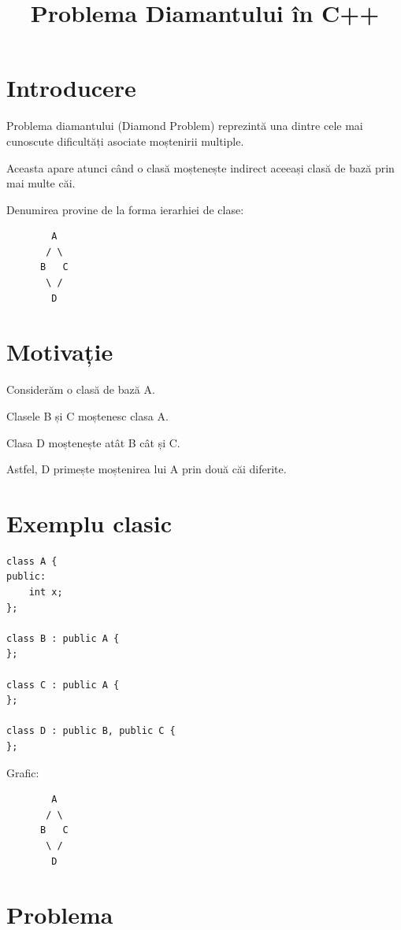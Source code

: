 \documentclass[12pt,a4paper]{article}
\title{Problema Diamantului în C++}
\author{}
\date{}
\begin{document}
\maketitle

\section{Introducere}

Problema diamantului (Diamond Problem) reprezintă una dintre cele mai cunoscute dificultăți asociate moștenirii multiple.

Aceasta apare atunci când o clasă moștenește indirect aceeași clasă de bază prin mai multe căi.

Denumirea provine de la forma ierarhiei de clase:

\begin{verbatim}
        A
       / \
      B   C
       \ /
        D
\end{verbatim}

\section{Motivație}

Considerăm o clasă de bază A.

Clasele B și C moștenesc clasa A.

Clasa D moștenește atât B cât și C.

Astfel, D primește moștenirea lui A prin două căi diferite.

\section{Exemplu clasic}

\begin{verbatim}
class A {
public:
    int x;
};

class B : public A {
};

class C : public A {
};

class D : public B, public C {
};
\end{verbatim}

Grafic:

\begin{verbatim}
        A
       / \
      B   C
       \ /
        D
\end{verbatim}

\section{Problema}
\end{document}
